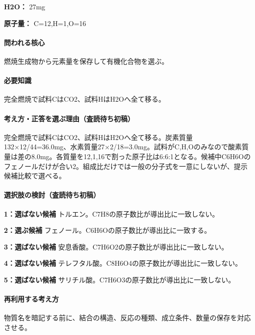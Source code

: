\noindent\textbf{H2O：} 27mg\par

\noindent\textbf{原子量：} C=\allowbreak{}12,H=\allowbreak{}1,O=\allowbreak{}16\par

\paragraph{問われる核心} 燃焼生成物から元素量を保存して有機化合物を選ぶ。

\paragraph{必要知識} 完全燃焼で試料CはCO2、試料HはH2Oへ全て移る。

\paragraph{考え方・正答を選ぶ理由（査読待ち初稿）} 完全燃焼で試料CはCO2、試料HはH2Oへ全て移る。炭素質量132×12/44=\allowbreak{}36.0mg、水素質量27×2/18=\allowbreak{}3.0mg。試料がC,H,Oのみなので酸素質量は差の8.0mg。各質量を12,1,16で割った原子比は6:6:1となる。候補中C6H6Oのフェノールだけが合い2。組成比だけでは一般の分子式を一意にしないが、提示候補比較で選べる。

\paragraph{選択肢の検討（査読待ち初稿）}\mbox{}\par

\noindent\textbf{1：選ばない候補} トルエン。C7H8の原子数比が導出比に一致しない。\par

\noindent\textbf{2：選ぶ候補} フェノール。C6H6Oの原子数比が導出比に一致する。\par

\noindent\textbf{3：選ばない候補} 安息香酸。C7H6O2の原子数比が導出比に一致しない。\par

\noindent\textbf{4：選ばない候補} テレフタル酸。C8H6O4の原子数比が導出比に一致しない。\par

\noindent\textbf{5：選ばない候補} サリチル酸。C7H6O3の原子数比が導出比に一致しない。\par

\paragraph{再利用する考え方} 物質名を暗記する前に、結合の構造、反応の種類、成立条件、数量の保存を対応させる。

